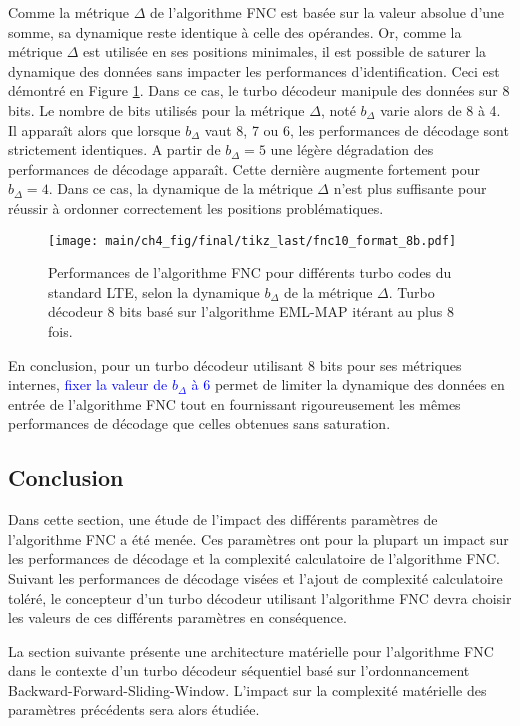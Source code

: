 Comme la métrique $\Delta$ de l'algorithme FNC est basée sur la valeur absolue d'une somme, sa dynamique reste identique 
à celle des opérandes. Or, comme la métrique $\Delta$  est utilisée en ses positions minimales, il est possible de 
saturer la dynamique des données sans impacter les performances d'identification. Ceci est démontré en Figure 
\ref{fig:fnc_format_8b}. Dans ce cas, le turbo décodeur manipule des données sur 8 bits. Le nombre de bits utilisés pour 
la métrique $\Delta$, noté $b_{\Delta}$ varie alors de 8 à 4. Il apparaît alors que lorsque $b_{\Delta}$ vaut 8, 7 ou 6,
les performances de décodage sont strictement identiques. A partir de $b_{\Delta} = 5$ une légère dégradation des 
performances de décodage apparaît. Cette dernière augmente fortement pour $b_{\Delta} = 4$. Dans ce cas, la dynamique 
de la métrique $\Delta$ n'est plus suffisante pour réussir à ordonner correctement les positions problématiques.

\begin{figure}[!t]
	\hspace*{-.075\textwidth}
	\texttt{[image: main/ch4\_fig/final/tikz\_last/fnc10\_format\_8b.pdf]}
	\caption{Performances de l'algorithme FNC pour différents turbo codes du standard LTE, selon la dynamique $b_{\Delta}$ 
	de la métrique $\Delta$.
	Turbo décodeur 8 bits basé sur l'algorithme EML-MAP itérant au plus 8 fois.
	\label{fig:fnc_format_8b}}
\end{figure}

En conclusion, pour un turbo décodeur utilisant 8 bits pour ses métriques internes, \textcolor{blue}{fixer la valeur de $b_{\Delta}$ 
à 6} permet de limiter la dynamique des données en entrée de l'algorithme FNC tout en fournissant 
rigoureusement les mêmes performances de décodage que celles obtenues sans saturation.

\subsection{Conclusion}
Dans cette section, une étude de l'impact des différents paramètres de l'algorithme FNC a été menée. Ces paramètres ont
pour la plupart un impact sur les performances de décodage et la complexité calculatoire de l'algorithme FNC. Suivant 
les performances de décodage visées et l'ajout de complexité calculatoire toléré, le concepteur d'un turbo décodeur 
utilisant l'algorithme FNC devra choisir les valeurs de ces différents paramètres en conséquence.

La section suivante présente une architecture matérielle pour l'algorithme FNC dans le contexte d'un turbo décodeur 
séquentiel basé sur l'ordonnancement Backward-Forward-Sliding-Window. L'impact sur la complexité matérielle des 
paramètres précédents sera alors étudiée.